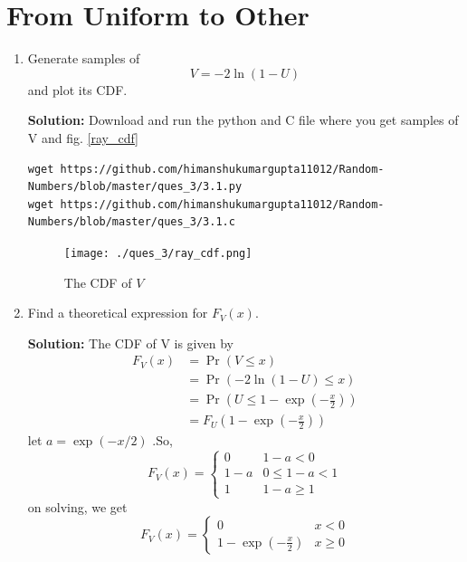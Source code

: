 \documentclass[journal,12pt,twocolumn]{IEEEtran}
\renewcommand\thesection{\arabic{section}}
\providecommand{\pr}[1]{\ensuremath{\Pr\left(#1\right)}}
\providecommand{\brak}[1]{\ensuremath{\left(#1\right)}}
\theoremstyle{remark}
\newcommand{\solution}{\noindent \textbf{Solution: }}
\numberwithin{equation}{section}
\begin{document}
\section{From Uniform to Other}
\begin{enumerate}[label=\thesection.\arabic*
,ref=\thesection.\theenumi]
%
\item
Generate samples of 
%
\begin{equation}
V = -2\ln\brak{1-U}
\end{equation}
%
and plot its CDF.  

\solution Download and run the python and C file where you get samples of V and fig. \ref{ray_cdf}
\begin{lstlisting}
wget https://github.com/himanshukumargupta11012/Random-Numbers/blob/master/ques_3/3.1.py
wget https://github.com/himanshukumargupta11012/Random-Numbers/blob/master/ques_3/3.1.c
\end{lstlisting}
\begin{figure}
	\centering
	\texttt{[image: ./ques\_3/ray\_cdf.png]}
	\caption{The CDF of $V$}
	\label{fig:1}
\end{figure}
\item Find a theoretical expression for $F_V(x)$.

\solution The CDF of V is given by 
\begin{align}
	F_V(x)&=\pr{V\leq x}\\
	&=\pr{-2\ln\brak{1-U} \leq x}\\
	&=\pr{U\leq 1-\exp\brak{-\frac{x}{2}}}\\
	&=F_U\brak{1-\exp\brak{-\frac{x}{2}}}
\end{align}
let $a=\exp\brak{-x/2}$ .So,
\[
F_V(x)=
\begin{cases}
	0&  1-a<0\\
	1-a  &  0 \leq 1-a < 1\\
	1&  1-a\geq1	
\end{cases}
\]
on solving, we get
\[
F_V(x)=
\begin{cases}
	0&  x<0\\
	1-\exp\brak{-\frac{x}{2}}  &  x\geq0
\end{cases}
\]
\end{enumerate}
\end{document}
